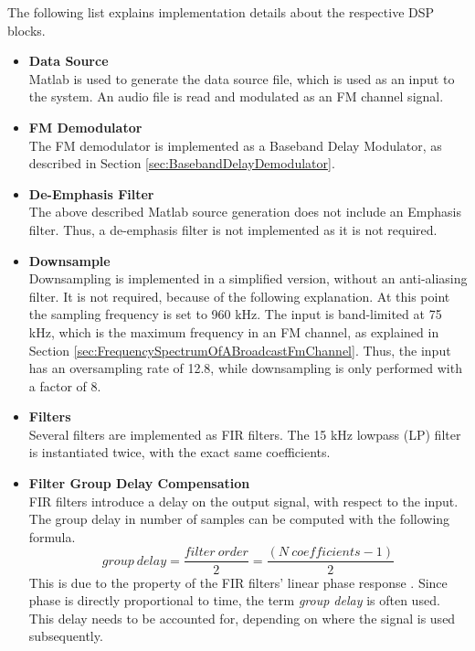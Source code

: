 \noindent
The following list explains implementation details about the respective DSP blocks.
\begin{itemize}
  \item \textbf{Data Source}\\
      Matlab is used to generate the data source file, which is used as an input to the system.
      An audio file is read and modulated as an FM channel signal.

  \item \textbf{FM Demodulator}\\
      The FM demodulator is implemented as a Baseband Delay Modulator, as described in Section \ref{sec:BasebandDelayDemodulator}.

  \item \textbf{De-Emphasis Filter}\\
      The above described Matlab source generation does not include an Emphasis filter.
      Thus, a de-emphasis filter is not implemented as it is not required.

  \item \textbf{Downsample}\\
      Downsampling is implemented in a simplified version, without an anti-aliasing filter.
      It is not required, because of the following explanation.
      At this point the sampling frequency is set to 960 kHz.
      The input is band-limited at 75 kHz, which is the maximum frequency in an FM channel, as explained in Section \ref{sec:FrequencySpectrumOfABroadcastFmChannel}.
      Thus, the input has an oversampling rate of 12.8, while downsampling is only performed with a factor of 8.

  \item \textbf{Filters}\\
      Several filters are implemented as FIR filters.
      The 15 kHz lowpass (LP) filter is instantiated twice, with the exact same coefficients.

  \item \textbf{Filter Group Delay Compensation}\\
      FIR filters introduce a delay on the output signal, with respect to the input.
      The group delay in number of samples can be computed with the following formula.
      \begin{equation}
        group\ delay = \frac{filter\ order}{2} = \frac{(N\ coefficients - 1)}{2}
      \end{equation}
      This is due to the property of the FIR filters' linear phase response \cite{GaziOrhan2018UDSP}.
      Since phase is directly proportional to time, the term \textit{group delay} is often used.
      This delay needs to be accounted for, depending on where the signal is used subsequently.


\end{itemize}
